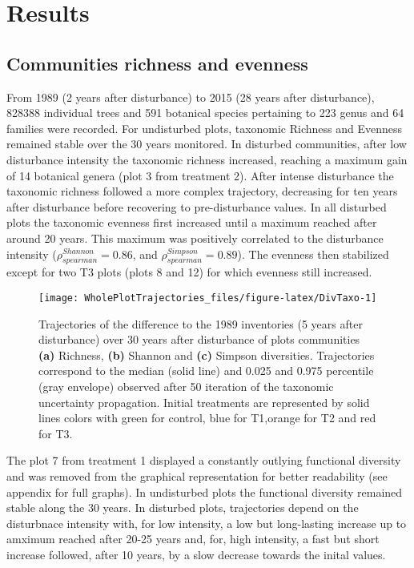 \documentclass[fleqn,10pt]{ArtEcoFoG} %
\begin{document}
\section{Results}\label{results}

\subsection{Communities richness and
evenness}\label{communities-richness-and-evenness}

From 1989 (2 years after disturbance) to 2015 (28 years after
disturbance), 828388 individual trees and 591 botanical species
pertaining to 223 genus and 64 families were recorded. For undisturbed
plots, taxonomic Richness and Evenness remained stable over the 30 years
monitored. In disturbed communities, after low disturbance intensity the
taxonomic richness increased, reaching a maximum gain of 14 botanical
genera (plot 3 from treatment 2). After intense disturbance the
taxonomic richness followed a more complex trajectory, decreasing for
ten years after disturbance before recovering to pre-disturbance values.
In all disturbed plots the taxonomic evenness first increased until a
maximum reached after around 20 years. This maximum was positively
correlated to the disturbance intensity
(\(\rho_{spearman}^{Shannon}=0.86\), and
\(\rho_{spearman}^{Simpson}=0.89\)). The evenness then stabilized except
for two T3 plots (plots 8 and 12) for which evenness still increased.

\begin{figure*}

{\centering \texttt{[image: WholePlotTrajectories\_files/figure-latex/DivTaxo-1]} 

}

\caption{Trajectories of the difference to the 1989 inventories (5 years after disturbance) over 30 years after disturbance of plots communities \textbf{(a)} Richness, \textbf{(b)} Shannon and \textbf{(c)} Simpson diversities. Trajectories correspond to the median (solid line) and 0.025 and 0.975 percentile (gray envelope) observed after 50 iteration of the taxonomic uncertainty propagation. Initial treatments are represented by solid lines colors with green for control, blue for T1,orange for T2 and red for T3.}\label{fig:DivTaxo}
\end{figure*}

The plot 7 from treatment 1 displayed a constantly outlying functional
diversity and was removed from the graphical representation for better
readability (see appendix for full graphs). In undisturbed plots the
functional diversity remained stable along the 30 years. In disturbed
plots, trajectories depend on the disturbnace intensity with, for low
intensity, a low but long-lasting increase up to amximum reached after
20-25 years and, for, high intensity, a fast but short increase
followed, after 10 years, by a slow decrease towards the inital values.
\end{document}
